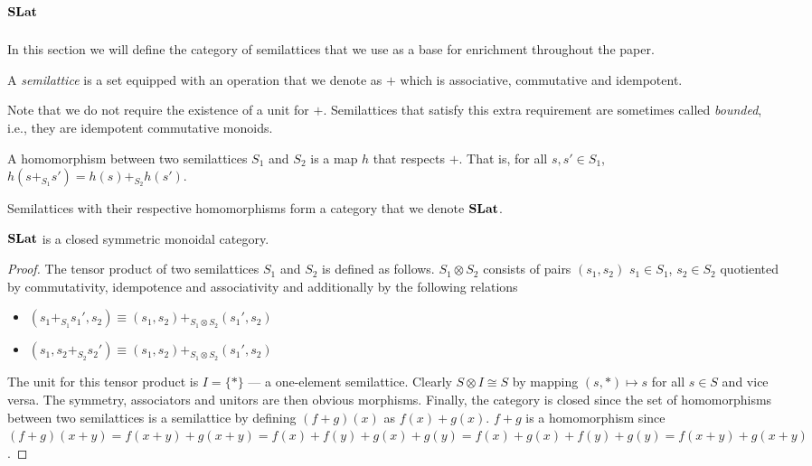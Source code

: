 \section{$\mathbf{SLat}$}
\label{sec:appendix:slat}

In this section we will define the category of semilattices that we use as a base for enrichment throughout the paper.

\begin{definition}[Semilattice]
	A \textit{semilattice} is a set equipped with an operation that we denote as $+$ which is associative, commutative and idempotent.
\end{definition}

Note that we do not require the existence of a unit for $+$.
Semilattices that satisfy this extra requirement are sometimes called \textit{bounded}, i.e., they are idempotent commutative monoids.

\begin{definition}
	A homomorphism between two semilattices $S_{1}$ and $S_{2}$ is a map $h$ that respects $+$.
	That is, for all $s,s' \in S_{1}$, $h(s +_{S_{1}} s') = h(s) +_{S_{2}} h(s')$.
\end{definition}

\begin{definition}
	Semilattices with their respective homomorphisms form a category that we denote $\mathbf{SLat}$.
\end{definition}

  \begin{proposition}
    $\mathbf{SLat}$ is a closed symmetric monoidal category.
  \end{proposition}
  \begin{proof}
    The tensor product of two semilattices $S_{1}$ and $S_{2}$ is defined as follows.
    $S_{1} \otimes S_{2}$ consists of pairs $(s_1,s_2)$ $s_{1} \in S_{1}$, $s_{2} \in S_{2}$ quotiented by commutativity, idempotence and associativity and additionally by the following relations
    \begin{itemize}
      \item $(s_{1} +_{S_{1}} s_{1}',s_{2}) \equiv (s_{1},s_{2}) +_{S_{1} \otimes S_{2}} (s_{1}',s_{2})$
      \item $(s_{1}, s_{2} +_{S_{2}} s_{2}') \equiv (s_{1},s_{2}) +_{S_{1} \otimes S_{2}} (s_{1}',s_{2})$
    \end{itemize}
  
    The unit for this tensor product is $I = \{*\}$ --- a one-element semilattice.
    Clearly $S \otimes I \cong S$ by mapping $(s,*) \mapsto s$ for all $s \in S$ and vice versa.
    The symmetry, associators and unitors are then obvious morphisms.
    Finally, the category is closed since the set of homomorphisms between two semilattices is a semilattice by defining $(f + g)(x)$ as $f(x) + g(x)$.
    $f + g$ is a homomorphism since $(f + g)(x+y) = f(x+y) + g(x+y) = f(x) + f(y) + g(x) + g(y) = f(x) + g(x) + f(y) + g(y) = f(x+y) + g(x+y)$.
  \end{proof}
  

